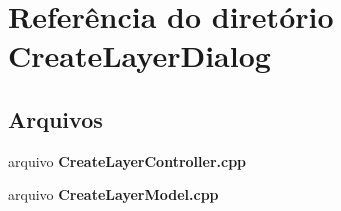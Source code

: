 \section{Referência do diretório Create\+Layer\+Dialog}
\label{dir_d999e9742df40ce698afa1d265218115}
\subsection*{Arquivos}
\begin{DoxyCompactItemize}
\item 
arquivo {\bf Create\+Layer\+Controller.\+cpp}
\item 
arquivo {\bf Create\+Layer\+Model.\+cpp}
\end{DoxyCompactItemize}
